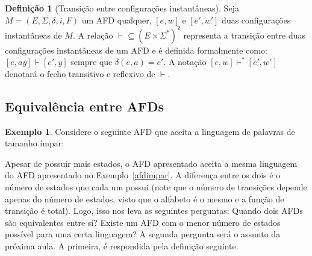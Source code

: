 \documentclass[a4paper]{article}
\theoremstyle{definition}
\newtheorem{Example}{Exemplo}
\newtheorem{Definition}{Definição}
\begin{document}
  \begin{Definition}[Transição entre configurações instantâneas]
    Seja $M = (E,\Sigma, \delta,i, F)$ um AFD qualquer, $[e,w]$ e $[e',w']$ duas
    configurações instantâneas de $M$. A relação $\vdash \subseteq (E \times
    \Sigma^*)^2$ representa a transição entre duas configurações instantâneas de
    um AFD e é definida formalmente como: $[e,ay] \vdash [e', y]$ sempre que
    $\delta(e,a) = e'$. A notação $[e,w] \vdash^* [e',w']$ denotará o fecho
    transitivo e reflexivo de $\vdash$.
  \end{Definition}


  \subsection{Equivalência entre AFDs}


  \begin{Example}
    Considere o seguinte AFD que aceita a linguagem de palavras de tamanho ímpar:
    \begin{figure}[H]
      \centering
    \end{figure}

    Apesar de possuir mais estados, o AFD apresentado aceita a mesma linguagem
    do AFD apresentado no Exemplo~\ref{afdimpar}. A diferença entre os dois é
    o número de estados que cada um possui (note que o número de transições
    depende apenas do número de estados, visto que o alfabeto é o mesmo e a
    função de transição é total). Logo, isso nos leva as seguintes perguntas:
    Quando dois AFDs são equivalentes entre si?
    Existe um AFD com o menor número de estados possível para uma certa
    linguagem? A segunda pergunta será o assunto da próxima aula. A primeira, é
    respondida pela definição seguinte.
  \end{Example}
\end{document}
